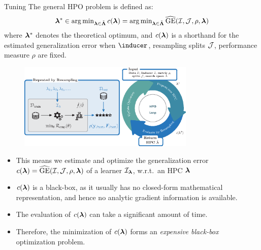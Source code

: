 \documentclass[11pt,compress,t,notes=noshow, xcolor=table]{beamer}
\begin{document}
\begin{vbframe}{Tuning}
\framebreak
The general HPO problem is defined as:
\begin{eqnarray*}
    \bm{\lambda}^{*} \in \operatorname{arg\,min}_{\bm{\lambda} \in \tilde{\bm{\Lambda}}} c(\bm{\lambda}) = \operatorname{arg\,min}_{\bm{\lambda} \in \tilde{\bm{\Lambda}}} 
    \widehat{\mathrm{GE}}(\mathcal{I}, \mathcal{J}, \rho, \bm{\lambda})
\end{eqnarray*}
where $\bm{\lambda}^{*}$ denotes the theoretical optimum, and $c(\bm{\lambda})$ is a shorthand for the estimated generalization error when $\inducer$, resampling splits $\mathcal{J}$, performance measure $\rho$ are fixed.

\begin{figure}[h]
    \centering
    \includegraphics[width = 0.75\textwidth]{figure/hpo_loop_1.eps}
\end{figure}

\framebreak

\begin{itemize}
\item This means we estimate and optimize the generalization error $c(\bm{\lambda}) = \widehat{\mathrm{GE}}(\mathcal{I}, \mathcal{J}, \rho, \bm{\lambda})$ of a learner $\mathcal{I}_{\bm{\lambda}}$, w.r.t.\ an HPC $\bm{\lambda}$
\item  $c(\bm{\lambda})$ is a black-box, as it usually has no closed-form mathematical representation, and hence no analytic gradient information is available. 
\item The evaluation of $c(\bm{\lambda})$ can take a significant amount of time.
\item Therefore, the minimization of $c(\bm{\lambda})$ forms an \emph{expensive black-box} optimization problem.
\end{itemize}

\end{vbframe}
\end{document}
